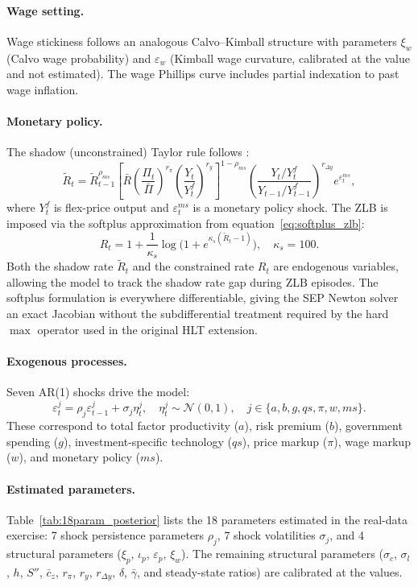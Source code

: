 \documentclass[12pt]{article}
\theoremstyle{plain}
\theoremstyle{definition}
\theoremstyle{remark}
\begin{document}
\paragraph{Wage setting.} Wage stickiness follows an analogous Calvo--Kimball structure with parameters $\xi_w$ (Calvo wage probability) and $\varepsilon_w$ (Kimball wage curvature, calibrated at the \citet{smets2007shocks} value and not estimated). The wage Phillips curve includes partial indexation to past wage inflation.

\paragraph{Monetary policy.} The shadow (unconstrained) Taylor rule follows \citet{smets2007shocks}:
\[
\tilde{R}_t = \tilde{R}_{t-1}^{\rho_{ms}} \!\left[\bar{R}\left(\frac{\Pi_t}{\bar{\Pi}}\right)^{r_\pi} \!\left(\frac{Y_t}{Y_t^f}\right)^{r_y}\right]^{1-\rho_{ms}} \!\left(\frac{Y_t/Y_t^f}{Y_{t-1}/Y_{t-1}^f}\right)^{r_{\Delta y}} e^{\varepsilon_t^{ms}},
\]
where $Y_t^f$ is flex-price output and $\varepsilon_t^{ms}$ is a monetary policy shock. The ZLB is imposed via the softplus approximation from equation~\eqref{eq:softplus_zlb}:
\[
R_t = 1 + \frac{1}{\kappa_s}\log\!\bigl(1 + e^{\kappa_s(\tilde{R}_t - 1)}\bigr), \quad \kappa_s = 100.
\]
Both the shadow rate $\tilde{R}_t$ and the constrained rate $R_t$ are endogenous variables, allowing the model to track the shadow rate gap during ZLB episodes. The softplus formulation is everywhere differentiable, giving the SEP Newton solver an exact Jacobian without the subdifferential treatment required by the hard $\max$ operator used in the original HLT extension.

\paragraph{Exogenous processes.} Seven AR(1) shocks drive the model:
\[
\varepsilon_t^j = \rho_j \varepsilon_{t-1}^j + \sigma_j \eta_t^j, \quad \eta_t^j \sim \mathcal{N}(0,1), \quad j \in \{a, b, g, qs, \pi, w, ms\}.
\]
These correspond to total factor productivity ($a$), risk premium ($b$), government spending ($g$), investment-specific technology ($qs$), price markup ($\pi$), wage markup ($w$), and monetary policy ($ms$).

\paragraph{Estimated parameters.} Table~\ref{tab:18param_posterior} lists the 18 parameters estimated in the real-data exercise: 7 shock persistence parameters $\rho_j$, 7 shock volatilities $\sigma_j$, and 4 structural parameters ($\xi_p$, $\iota_p$, $\varepsilon_p$, $\xi_w$). The remaining structural parameters ($\sigma_c$, $\sigma_l$, $h$, $S''$, $\bar{c}_z$, $r_\pi$, $r_y$, $r_{\Delta y}$, $\delta$, $\bar{\gamma}$, and steady-state ratios) are calibrated at the \citet{smets2007shocks} values.
\end{document}
